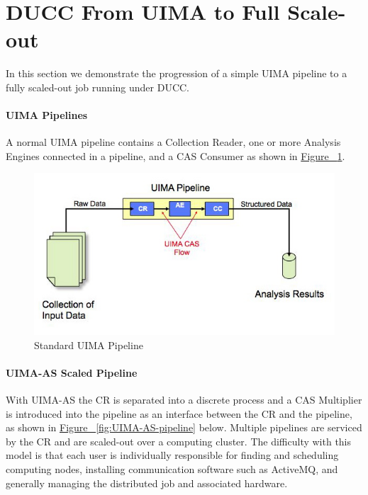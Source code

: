     \section{DUCC From UIMA to Full Scale-out}

    In this section we demonstrate the progression of a simple UIMA pipeline to a fully
    scaled-out job running under DUCC.

    \paragraph{UIMA Pipelines}
    A normal UIMA pipeline
    contains a Collection Reader, one or more Analysis Engines connected in a pipeline, and a CAS
    Consumer as shown in \hyperref[fig:UIMA-pipeline]{Figure ~\ref{fig:UIMA-pipeline}}.

    \begin{figure}[H]
      \centering
      \includegraphics[bb=0 0 575 310, width=5.5in]{images/uima-pipeline.jpg}
      \caption{Standard UIMA Pipeline}
      \label{fig:UIMA-pipeline}
    \end{figure}

    \paragraph{UIMA-AS  Scaled Pipeline}
    With UIMA-AS the CR is separated into a discrete process and a CAS Multiplier is introduced 
    into the pipeline as an interface between the CR and the pipeline, as shown in
    \hyperref[fig:UIMA-AS-pipeline]{Figure ~\ref{fig:UIMA-AS-pipeline}} below.
    Multiple pipelines are serviced by the 
    CR and are scaled-out over a computing cluster.  The difficulty with this model is that each
    user is individually responsible for finding and scheduling computing nodes, installing
    communication software such as ActiveMQ, and generally managing the distributed job and
    associated hardware.


